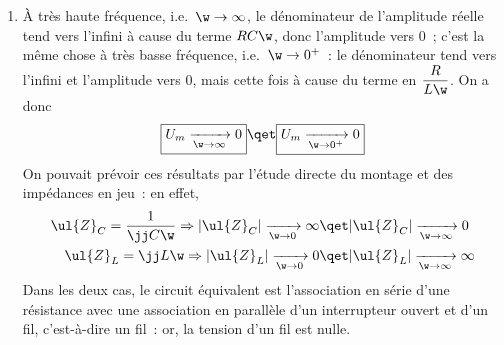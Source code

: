 \documentclass[a4paper, 12pt, final, garamond]{book}
\begin{document}
\begin{enumerate}
	\item À très haute fréquence, i.e.\ $\w\rightarrow\infty$, le dénominateur
	      de l'amplitude réelle tend vers l'infini à cause du terme $RC\w$, donc
	      l'amplitude vers 0~; c'est la même chose à très basse fréquence, i.e.\
	      $\w\rightarrow0^+$~: le dénominateur tend vers l'infini et l'amplitude
	      vers 0, mais cette fois à cause du terme en $\dfrac{R}{L\w}$. On a donc
	      \[
		      \boxed{U_m \xrightarrow[\w\rightarrow\infty]{} 0}
		      \qet
		      \boxed{U_m \xrightarrow[\w\rightarrow0^+]{} 0}
	      \]
	      On pouvait prévoir ces résultats par l'étude directe du montage et des
	      impédances en jeu~: en effet,
	      \begin{align*}
		      \ul{Z}_C
		      = \frac{1}{\jj C\w}
		      \Rightarrow
		      |\ul{Z}_C| \xrightarrow[\w\rightarrow0]{} \infty
		       & \qet
		      |\ul{Z}_C| \xrightarrow[\w\rightarrow\infty]{} 0 \\
		      \ul{Z}_L
		      = \jj L\w
		      \Rightarrow
		      |\ul{Z}_L| \xrightarrow[\w\rightarrow0]{} 0
		       & \qet
		      |\ul{Z}_L| \xrightarrow[\w\rightarrow\infty]{} \infty
	      \end{align*}
	      Dans les deux cas, le circuit équivalent est l'association en série
	      d'une résistance avec une association en parallèle d'un interrupteur
	      ouvert et d'un fil, c'est-à-dire un fil~: or, la tension d'un fil est
	      nulle.
\end{enumerate}
\end{document}

